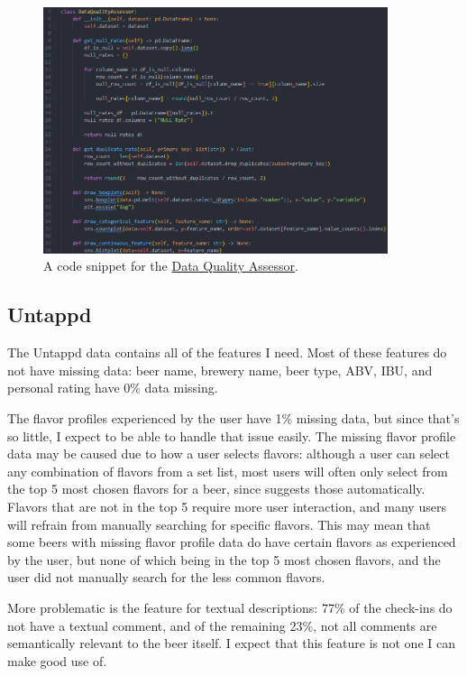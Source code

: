 \documentclass[sigconf, natbib=true]{acmart}
\begin{document}
\begin{figure}
    \centering
    \includegraphics[width=0.9\textwidth]{code_data_quality_assessor.png}
    \caption{A code snippet for the \href{https://github.com/daanbrugmans/ru-data-engineering-23-24/blob/main/code/data_quality/data_quality_assessor.py}{Data Quality Assessor}.}
    \label{fig:code_data_quality_assessor}
\end{figure}

\subsection{Untappd}
The Untappd data contains all of the features I need.
Most of these features do not have missing data: beer name, brewery name, beer type, ABV, IBU, and personal rating have 0\% data missing.

The flavor profiles experienced by the user have 1\% missing data, but since that's so little, I expect to be able to handle that issue easily.
The missing flavor profile data may be caused due to how a user selects flavors: although a user can select any combination of flavors from a set list, most users will often only select from the top 5 most chosen flavors for a beer, since \citeauthor{untappd} suggests those automatically.
Flavors that are not in the top 5 require more user interaction, and many users will refrain from manually searching for specific flavors.
This may mean that some beers with missing flavor profile data do have certain flavors as experienced by the user, but none of which being in the top 5 most chosen flavors, and the user did not manually search for the less common flavors.

More problematic is the feature for textual descriptions: 77\% of the check-ins do not have a textual comment, and of the remaining 23\%, not all comments are semantically relevant to the beer itself.
I expect that this feature is not one I can make good use of.
\end{document}
